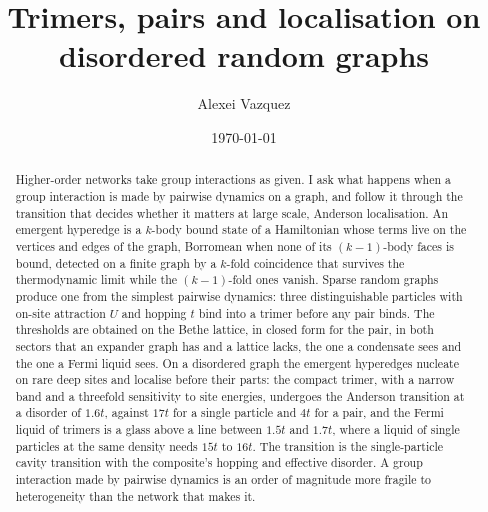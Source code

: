 \documentclass[aps,pre,twocolumn,superscriptaddress,floatfix]{revtex4-2}
\begin{document}
\title{Trimers, pairs and localisation on disordered random graphs}
\author{Alexei Vazquez}
\date{\today}

\begin{abstract}
Higher-order networks take group interactions as given. I ask what
happens when a group interaction is made by pairwise dynamics on a
graph, and follow it through the transition that decides whether it
matters at large scale, Anderson localisation. An emergent hyperedge is
a $k$-body bound state of a Hamiltonian whose terms live on the vertices
and edges of the graph, Borromean when none of its $(k-1)$-body faces is
bound, detected on a finite graph by a $k$-fold coincidence that
survives the thermodynamic limit while the $(k-1)$-fold ones vanish.
Sparse random graphs produce one from the simplest pairwise dynamics:
three distinguishable particles with on-site attraction $U$ and hopping
$t$ bind into a trimer before any pair binds. The thresholds are
obtained on the Bethe lattice, in closed form for the pair, in both
sectors that an expander graph has and a lattice lacks, the one a
condensate sees and the one a Fermi liquid sees. On a disordered graph
the emergent hyperedges nucleate on rare deep sites and localise before
their parts: the compact trimer, with a narrow band and a threefold
sensitivity to site energies, undergoes the Anderson transition at a
disorder of $1.6t$, against $17t$ for a single particle and $4t$ for a
pair, and the Fermi liquid of trimers is a glass above a line between
$1.5t$ and $1.7t$, where a liquid of single particles at the same density
needs $15t$ to $16t$. The transition is the single-particle cavity
transition with the composite's hopping and effective disorder. A group
interaction made by pairwise dynamics is an order of magnitude more
fragile to heterogeneity than the network that makes it.
\end{abstract}

\maketitle
\end{document}
